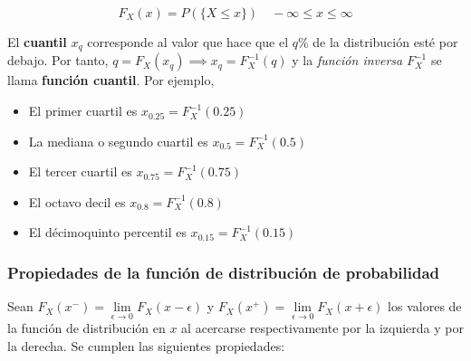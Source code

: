 \documentclass[11pt]{article}
\providecommand{\tightlist}{%
      \setlength{\itemsep}{0pt}\setlength{\parskip}{0pt}}
\begin{document}
\[F_X(x) = P(\{X\leq x\}) \quad -\infty \leq x \leq \infty\]

El \textbf{cuantil} \(x_q\) corresponde al valor que hace que el \(q\%\)
de la distribución esté por debajo. Por tanto,
\(q = F_X(x_q) \implies x_q = F_X^{-1}(q)\) y la \emph{función inversa}
\(F_X^{-1}\) se llama \textbf{función cuantil}. Por ejemplo,

\begin{itemize}
\tightlist
\item
  El primer cuartil es \(x_{0.25} = F_X^{-1}(0.25)\)
\item
  La mediana o segundo cuartil es \(x_{0.5} = F_X^{-1}(0.5)\)
\item
  El tercer cuartil es \(x_{0.75} = F_X^{-1}(0.75)\)
\item
  El octavo decil es \(x_{0.8} = F_X^{-1}(0.8)\)
\item
  El décimoquinto percentil es \(x_{0.15} = F_X^{-1}(0.15)\)
\end{itemize}

    \hypertarget{propiedades-de-la-funciuxf3n-de-distribuciuxf3n-de-probabilidad}{%
\subsubsection*{Propiedades de la función de distribución de
probabilidad}\label{propiedades-de-la-funciuxf3n-de-distribuciuxf3n-de-probabilidad}}

Sean \(F_X(x^-)=\lim \limits_{\epsilon \to 0} F_X(x-\epsilon)\) y
\(F_X(x^+)=\lim \limits_{\epsilon \to 0} F_X(x+\epsilon)\) los valores
de la función de distribución en \(x\) al acercarse respectivamente por
la izquierda y por la derecha. Se cumplen las siguientes propiedades:
\end{document}
